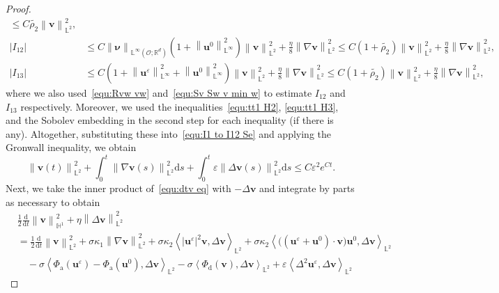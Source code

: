 \documentclass[10pt,a4paper]{amsart}
\newcommand{\abs}[1]{\left|{#1}\right|}
\newcommand{\bb}{\mathbb}
\newcommand{\bff}{\boldsymbol}
\newcommand{\ddt}{\frac{\mathrm{d}}{\mathrm{d}t}}
\newcommand{\ds}{\mathrm{d}s}
\newcommand{\inpro}[2]{\left\langle#1,#2\right\rangle}
\newcommand{\norm}[2]{\left\|{#1}\right\|_{#2}}
\begin{document}
\begin{proof}
\begin{align*}
    \leq 
    C\widetilde{\rho_2} \norm{\bff{v}}{\bb{L}^2}^2,
    \\
    \abs{I_{12}}
    &\leq
    C \norm{\bff{\nu}}{\bb{L}^\infty(\mathscr{O};\bb{R}^d)} \left(1+ \norm{\bff{u}^0}{\bb{L}^\infty}^2 \right) \norm{\bff{v}}{\bb{L}^2}^2
    +
    \frac{\eta}{8} \norm{\nabla \bff{v}}{\bb{L}^2}^2
    \leq 
    C(1+\widetilde{\rho_2}) \norm{\bff{v}}{\bb{L}^2}^2
    +
    \frac{\eta}{8} \norm{\nabla \bff{v}}{\bb{L}^2}^2,
    \\
    \abs{I_{13}}
    &\leq
    C\left(1+\norm{\bff{u}^\varepsilon}{\bb{L}^\infty}^2 + \norm{\bff{u}^0}{\bb{L}^\infty}^2\right) \norm{\bff{v}}{\bb{L}^2}^2
    +
    \frac{\eta}{8} \norm{\nabla \bff{v}}{\bb{L}^2}^2
    \leq
    C(1+\widetilde{\rho_2}) \norm{\bff{v}}{\bb{L}^2}^2
    +
    \frac{\eta}{8} \norm{\nabla \bff{v}}{\bb{L}^2}^2,
\end{align*}
where we also used~\eqref{equ:Rvw vw} and~\eqref{equ:Sv Sw v min w} to estimate $I_{12}$ and $I_{13}$ respectively. Moreover, we used the inequalities~\eqref{equ:tt1 H2}, \eqref{equ:tt1 H3}, and the Sobolev embedding in the second step for each inequality (if there is any). Altogether, substituting these into~\eqref{equ:I1 to I12 Se} and applying the Gronwall inequality, we obtain
\begin{equation}\label{equ:vt eps L2}
    \norm{\bff{v}(t)}{\bb{L}^2}^2
    +
    \int_0^t \norm{\nabla \bff{v}(s)}{\bb{L}^2}^2 \ds 
    +
    \int_0^t \varepsilon \norm{\Delta \bff{v}(s)}{\bb{L}^2}^2 \ds
    \leq
    C\varepsilon^2 e^{Ct}.
\end{equation}
Next, we take the inner product of~\eqref{equ:dtv eq} with $-\Delta \bff{v}$ and integrate by parts as necessary to obtain
\begin{align}\label{equ:J1 to J16 nab v}
    &\frac12 \ddt \norm{\bff{v}}{\bb{H}^1}^2
    +
    \eta \norm{\Delta \bff{v}}{\bb{L}^2}^2
    \nonumber\\
    &=
    \frac12 \ddt \norm{\bff{v}}{\bb{L}^2}^2
    +
    \sigma\kappa_1 \norm{\nabla \bff{v}}{\bb{L}^2}^2
    +
    \sigma\kappa_2 \inpro{|\bff{u}^\varepsilon|^2 \bff{v}}{\Delta \bff{v}}_{\bb{L}^2}
    +
    \sigma\kappa_2 \inpro{\big((\bff{u}^\varepsilon+\bff{u}^0)\cdot \bff{v}\big) \bff{u}^0}{\Delta \bff{v}}_{\bb{L}^2}
    \nonumber\\
    &\quad
    -
    \sigma \inpro{\Phi_{\mathrm{a}}(\bff{u}^\varepsilon)-\Phi_{\mathrm{a}}(\bff{u}^0)}{\Delta \bff{v}}_{\bb{L}^2}
    -
    \sigma \inpro{\Phi_{\mathrm{d}}(\bff{v})}{\Delta \bff{v}}_{\bb{L}^2}
    +
    \varepsilon \inpro{\Delta^2 \bff{u}^\varepsilon}{\Delta \bff{v}}_{\bb{L}^2}

\end{align}
\end{proof}
\end{document}
